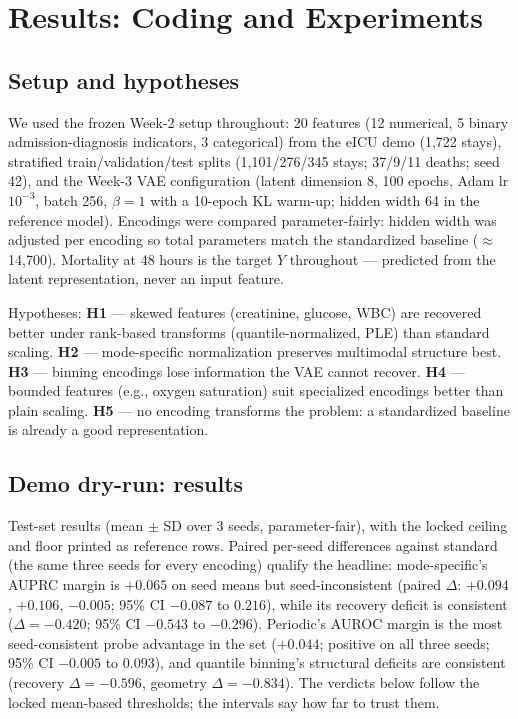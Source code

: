 \documentclass[onecolumn]{sigchi}
\begin{document}
\section{Results: Coding and Experiments}
\subsection{Setup and hypotheses}
We used the frozen Week-2 setup throughout: 20 features (12 numerical, 5
binary admission-diagnosis indicators, 3 categorical) from the eICU demo
(1,722 stays), stratified train/validation/test splits (1,101/276/345
stays; 37/9/11 deaths; seed 42), and the Week-3 VAE configuration (latent
dimension 8, 100 epochs, Adam lr $10^{-3}$, batch 256, $\beta = 1$ with a
10-epoch KL warm-up; hidden width 64 in the reference model). Encodings were
compared parameter-fairly: hidden width was adjusted per encoding so total
parameters match the standardized baseline ($\approx$14,700). Mortality at
48 hours is the target $Y$ throughout --- predicted from the latent
representation, never an input feature.

Hypotheses: \textbf{H1} --- skewed features (creatinine, glucose, WBC) are
recovered better under rank-based transforms (quantile-normalized, PLE) than standard scaling.
\textbf{H2} --- mode-specific normalization preserves multimodal structure
best. \textbf{H3} --- binning encodings lose information the VAE cannot
recover. \textbf{H4} --- bounded features (e.g., oxygen saturation) suit
specialized encodings better than plain scaling. \textbf{H5} --- no encoding
transforms the problem: a standardized baseline is already a good
representation.

\subsection{Demo dry-run: results}
Test-set results (mean $\pm$ SD over 3 seeds, parameter-fair), with the
locked ceiling and floor printed as reference rows. Paired per-seed
differences against standard (the same three seeds for every encoding)
qualify the headline: mode-specific's AUPRC margin is $+0.065$ on seed
means but seed-inconsistent (paired $\Delta$: $+0.094$, $+0.106$,
$-0.005$; 95\% CI $-0.087$ to $0.216$), while its recovery deficit is
consistent ($\Delta = -0.420$; 95\% CI $-0.543$ to $-0.296$). Periodic's
AUROC margin is the most seed-consistent probe advantage in the set
($+0.044$; positive on all three seeds; 95\% CI $-0.005$ to $0.093$), and
quantile binning's structural deficits are consistent (recovery
$\Delta = -0.596$, geometry $\Delta = -0.834$). The verdicts below follow
the locked mean-based thresholds; the intervals say how far to trust
them.
\end{document}
